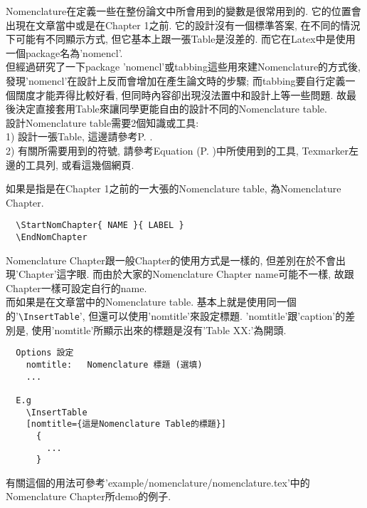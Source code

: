 
Nomenclature在定義一些在整份論文中所會用到的變數是很常用到的. 它的位置會出現在文章當中或是在Chapter 1之前. 它的設計沒有一個標準答案, 在不同的情況下可能有不同顯示方式, 但它基本上跟一張Table是沒差的. 而它在Latex中是使用一個package名為'nomencl'.\\

但經過研究了一下package 'nomencl'或tabbing這些用來建Nomenclature的方式後, 發現'nomencl'在設計上反而會增加在產生論文時的步驟; 而tabbing要自行定義一個闊度才能弄得比較好看, 但同時內容卻出現沒法置中和設計上等一些問題. 故最後決定直接套用Table來讓同學更能自由的設計不同的Nomenclature table.\\

設計Nomenclature table需要2個知識或工具:\\
1) 設計一張Table, 這邊請參考P. .\\
2) 有關所需要用到的符號, 請參考Equation (P. )中所使用到的工具, Texmarker左邊的工具列, 或看這幾個網頁.

{}

如果是指是在Chapter 1之前的一大張的Nomenclature table, 為Nomenclature Chapter. 
  \begin{verbatim}
  \StartNomChapter{ NAME }{ LABEL }
  \EndNomChapter
  \end{verbatim}
Nomenclature Chapter跟一般Chapter的使用方式是一樣的, 但差別在於不會出現'Chapter'這字眼. 而由於大家的Nomenclature Chapter name可能不一樣, 故跟Chapter一樣可設定自行的name.\\

而如果是在文章當中的Nomenclature table. 基本上就是使用同一個的'\verb|\InsertTable|', 但還可以使用'nomtitle'來設定標題. 'nomtitle'跟'caption'的差別是, 使用'nomtitle'所顯示出來的標題是沒有'Table XX:'為開頭.

  \EmptyLine
  \begin{fmpage}{\textwidth}
  \begin{verbatim}
  Options 設定
    nomtitle:   Nomenclature 標題 (選填)
    ...

  E.g
    \InsertTable
    [nomtitle={這是Nomenclature Table的標題}]
      {
        ...
      }
  \end{verbatim}
  \end{fmpage}
  \EmptyLine

有關這個的用法可參考'example/nomenclature/nomenclature.tex'中的Nomenclature Chapter所demo的例子.

